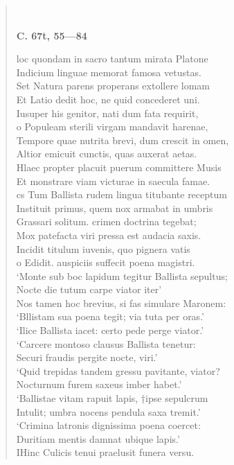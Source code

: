 \documentclass[11pt, a4paper]{report}
\begin{document}
\begin{verse}
        ﻿\pagebreak 
    \begin{center} \textbf{C. 67t, 55—84} \end{center} \marginpar{[143]} loc quondam in sacro tantum mirata Platone \\ Indicium linguae memorat famosa vetustas. \\ Set Natura parens properans extollere lomam \\ Et Latio dedit hoc, ne quid concederet uni. \\ Iusuper his genitor, nati dum fata requirit, \\ o Populeam sterili virgam mandavit harenae, \\ Tempore quae nutrita brevi, dum crescit in omen, \\ Altior emicuit cunctis, quas auxerat aetas. \\ Hlaec propter placuit puerum committere Musis \\ Et monstrare viam victurae in saecula famae. \\ cs Tum Ballista rudem lingua titubante receptum \\ Instituit primus, quem nox armabat in umbris \\ Grassari solitum. crimen doctrina tegebat; \\ Mox patefacta viri pressa est audacia saxis. \\ Incidit titulum iuvenis, quo pignera vatis \\ o Edidit. auspiciis suffecit poena magistri. \\  \lbrack ‘Monte sub boc lapidum tegitur Ballista sepultus; \\ Nocte die tutum carpe viator iter’ \rbrack  \\ Nos tamen hoc brevius, si fas simulare Maronem: \\ ‘Bllistam sua poena tegit; via tuta per oras.’ \\  \lbrack ‘Ilice Ballista iacet: certo pede perge viator.’ \rbrack  \\  \lbrack ‘Carcere montoso clausus Ballista tenetur: \\ Securi fraudis pergite nocte, viri.’ \rbrack  \\  \lbrack ‘Quid trepidas tandem gressu pavitante, viator? \\ Nocturnum furem saxeus imber habet.’ \rbrack  \\  \lbrack ‘Ballistae vitam rapuit lapis, †ipse sepulcrum \\ Intulit; umbra nocens pendula saxa tremit.’ \rbrack  \\ ‘Crimina latronis dignissima poena coercet: \\ Duritiam mentis damnat ubique lapis.’ \rbrack  \\ IHinc Culicis tenui praelusit funera versu. \\ 

\end{verse}
\end{document}
